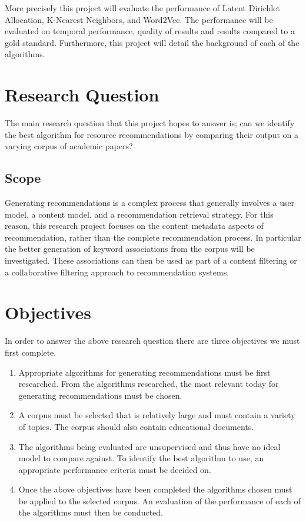 More precisely this project will evaluate the performance of Latent Dirichlet Allocation, K-Nearest Neighbors, and Word2Vec.
The performance will be evaluated on temporal performance, quality of results and results compared to a gold standard.
Furthermore, this project will detail the background of each of the algorithms.

\section{Research Question}
The main research question that this project hopes to answer is; can we identify the best algorithm for resource recommendations by comparing their output on a varying corpus of academic papers?

\subsection{Scope}
Generating recommendations is a complex process that generally involves a user model, a content model, and a recommendation retrieval strategy.
For this reason, this research project focuses on the content metadata aspects of recommendation, rather than the complete recommendation process.
In particular the better generation of keyword associations from the corpus will be investigated.
These associations can then be used as part of a content filtering or a collaborative filtering approach to recommendation systems.

\section{Objectives}
In order to answer the above research question there are three objectives we must first complete.

\begin{enumerate}
    \item Appropriate algorithms for generating recommendations must be first researched.
    From the algorithms researched, the most relevant today for generating recommendations must be chosen.

    \item A corpus must be selected that is relatively large and must contain a variety of topics.
    The corpus should also contain educational documents.

    \item The algorithms being evaluated are unsupervised and thus have no ideal model to compare against.
    To identify the best algorithm to use, an appropriate performance criteria must be decided on.

    \item Once the above objectives have been completed the algorithms chosen must be applied to the selected corpus.
    An evaluation of the performance of each of the algorithms must then be conducted.
\end{enumerate}

